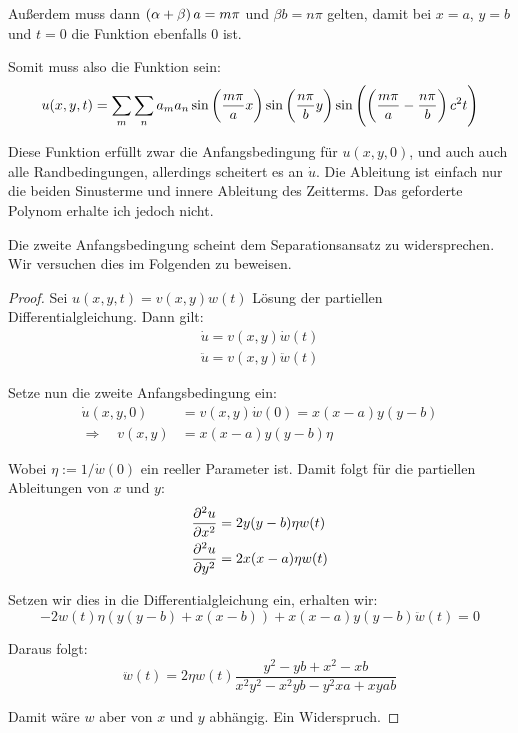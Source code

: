 \documentclass[11pt, ngerman, fleqn]{article}
\begin{document}
Außerdem muss dann $\del{\alpha + \beta} a = m \pi$ und $\beta b = n \pi$
gelten, damit bei $x=a$, $y=b$ und $t=0$ die Funktion ebenfalls $0$ ist.

Somit muss also die Funktion sein:
\[
	u(x, y, t)
	= \sum_m \sum_n a_m a_n \sin\del{\frac{m\pi}a x}
	\sin\del{\frac{n\pi}b y}
	\sin\del{\del{\frac{m\pi}a - \frac{n\pi}b} c^2 t}
\]

Diese Funktion erfüllt zwar die Anfangsbedingung für $u(x, y, 0)$, und auch
auch alle Randbedingungen, allerdings scheitert es an $\dot u$. Die Ableitung
ist einfach nur die beiden Sinusterme und innere Ableitung des Zeitterms. Das
geforderte Polynom erhalte ich jedoch nicht.

Die zweite Anfangsbedingung scheint dem Separationsansatz zu widersprechen. Wir
versuchen dies im Folgenden zu beweisen.

\begin{proof}
	Sei $u(x, y, t)=v(x, y)w(t)$ Lösung der partiellen Differentialgleichung.
	Dann gilt:
	\begin{align*}
		\dot u=v(x, y) \dot w(t) \\
		\ddot u=v(x, y) \ddot w(t)
	\end{align*}

	Setze nun die zweite Anfangsbedingung ein:
	\begin{align*}
		\dot u(x, y, 0)&=v(x, y) \dot w(0)=x(x-a)y(y-b) \\
\Rightarrow \quad v(x, y)&= x(x-a)y(y-b)\eta
	\end{align*}

	Wobei $\eta := 1/ \dot w(0)$ ein reeller Parameter ist. Damit folgt für die partiellen
	Ableitungen von $x$ und $y$:
	\begin{align*}
		\dpd[2] ux&=2y(y-b)\eta w(t) \\
	 \dpd[2] uy&=2x(x-a)\eta w(t)
	\end{align*}

	Setzen wir dies in die Differentialgleichung ein, erhalten wir:
	\[
		-2w(t)\eta (y(y-b)+x(x-b))+x(x-a)y(y-b) \ddot w(t) =0
	\]

	Daraus folgt:
	\[
		\ddot w(t) = 2 \eta w(t)\frac{y^2-yb+x^2-xb}{x^2y^2-x^2yb-y^2xa+xyab}
	\]

	Damit wäre $w$ aber von $x$ und $y$ abhängig. Ein Widerspruch.
\end{proof}

\end{document}
